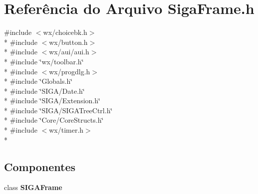 \section{Referência do Arquivo Siga\+Frame.\+h}
\label{_siga_frame_8h}
{\ttfamily \#include $<$wx/choicebk.\+h$>$}\\*
{\ttfamily \#include $<$wx/button.\+h$>$}\\*
{\ttfamily \#include $<$wx/aui/aui.\+h$>$}\\*
{\ttfamily \#include \char`\"{}wx/toolbar.\+h\char`\"{}}\\*
{\ttfamily \#include $<$wx/progdlg.\+h$>$}\\*
{\ttfamily \#include \char`\"{}Globals.\+h\char`\"{}}\\*
{\ttfamily \#include \char`\"{}S\+I\+G\+A/\+Date.\+h\char`\"{}}\\*
{\ttfamily \#include \char`\"{}S\+I\+G\+A/\+Extension.\+h\char`\"{}}\\*
{\ttfamily \#include \char`\"{}S\+I\+G\+A/\+S\+I\+G\+A\+Tree\+Ctrl.\+h\char`\"{}}\\*
{\ttfamily \#include \char`\"{}Core/\+Core\+Structs.\+h\char`\"{}}\\*
{\ttfamily \#include $<$wx/timer.\+h$>$}\\*
\subsection*{Componentes}
\begin{DoxyCompactItemize}
\item 
class {\bf S\+I\+G\+A\+Frame}
\end{DoxyCompactItemize}
